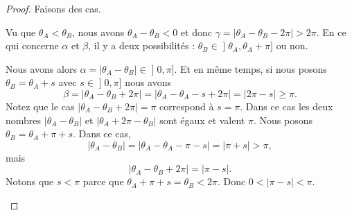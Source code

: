 \begin{proof}
	Faisons des cas.
	\begin{subproof}
		Vu que \( \theta_A<\theta_B\), nous avons \( \theta_A-\theta_B<0\) et donc \( \gamma=| \theta_A-\theta_B-2\pi |>2\pi\). En ce qui concerne \( \alpha\) et \( \beta\), il y a deux possibilités : \( \theta_B\in\mathopen] \theta_A,\theta_A+\pi\mathclose]\) ou non.
		\begin{subproof}
			Nous avons alors \(\alpha= | \theta_A-\theta_B |\in\mathopen] 0,\pi\mathclose]\). Et en même temps, si nous posons \( \theta_B=\theta_A+s\) avec \( s\in\mathopen] 0,\pi\mathclose]\) nous avons
			\begin{equation}
				\beta = | \theta_A-\theta_B+2\pi |  =| \theta_A-\theta_A-s+2\pi |
				=| 2\pi-s |
				\geq \pi.
			\end{equation}
			Notez que le cas \( | \theta_A-\theta_B+2\pi |=\pi\) correspond à \( s=\pi\). Dans ce cas les deux nombres \( | \theta_A-\theta_B |\) et \( | \theta_A+2\pi-\theta_B |\) sont égaux et valent \( \pi\).
			Nous posons \( \theta_B=\theta_A+\pi+s\). Dans ce cas,
			\begin{equation}
				| \theta_A-\theta_B |=| \theta_A-\theta_A-\pi-s |=| \pi+s |>\pi,
			\end{equation}
			mais
			\begin{equation}
				| \theta_A-\theta_B+2\pi |=| \pi-s |.
			\end{equation}
			Notons que \( s<\pi\) parce que \( \theta_A+\pi+s=\theta_B<2\pi\). Donc \( 0<| \pi-s |<\pi\).
		\end{subproof}


\end{subproof}
\end{proof}
